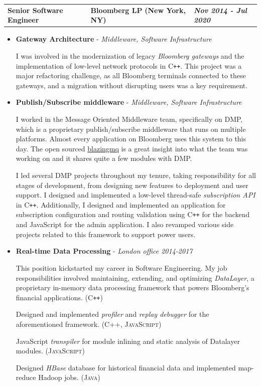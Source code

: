 \documentclass[a4paper,10pt]{article}
\newcommand*{\mahogany}{\textcolor{Mahogany}}
\newcommand{\jobtitle}[4]{
\vspace{0.3cm}
\begin{tabularx}
{\textwidth}
{ >{\raggedright\arraybackslash}p{6.5cm}
  >{\raggedright\arraybackslash}X
  >{\raggedleft\arraybackslash}p{4cm} }
\large\textbf{#1} &
\large\textbf{\mahogany{#2}} \normalsize\textbf{(#3)} &
\textit{\large\textbf{#4}}
\end{tabularx}
\vspace{-0.4cm}
}
\begin{document}
\jobtitle{Senior Software Engineer}{Bloomberg LP}{New York, NY}{Nov 2014 - Jul 2020}
\begin{itemize}[leftmargin=.27in,label=] \setlength\itemsep{-0.1cm}
	\item \textbf{Gateway Architecture} - \textit{Middleware, Software Infrastructure}

I was involved in the modernization of legacy \textit{Bloomberg gateways}
and the implementation of low-level network protocols in \textsc{C\texttt{++}}.
This project was a major refactoring challenge,
as all Bloomberg terminals connected to these gateways, and a migration without disrupting users was a key requirement.


    \vspace{0.2cm}
    \item \textbf{Publish/Subscribe middleware} - \textit{Middleware, Software Infrastructure}

I worked in the Message Oriented Middleware team, specifically on DMP, which is a proprietary publish/subscribe middleware that runs on multiple platforms. Almost every application on Bloomberg uses this system to this day.
The open sourced \href{https://bloomberg.github.io/blazingmq/}{blazingmq} is a great insight into what the team was working on and it shares quite a few modules with DMP.

I led several DMP projects throughout my tenure, taking responsibility for all stages of development, from designing new features to deployment and user support.
I designed and implemented a low-level thread-safe \textit{subscription API} in \textsc{C\texttt{++}}.
Additionally, I designed and implemented an application for subscription configuration and routing validation using \textsc{C\texttt{++}} for the backend and JavaScript for the admin application.
I also revamped various side projects related to this framework to support power users.

    \vspace{0.2cm}
    \item \textbf{Real-time Data Processing} - \textit{London office 2014-2017}

This position kickstarted my career in Software Engineering.
My job responsibilities involved maintaining, extending, and optimizing \textit{DataLayer},
a proprietary in-memory data processing framework that powers Bloomberg's financial applications. \textsc{(C\texttt{++})}

    Designed and implemented \textit{profiler} and \textit{replay debugger} for the aforementioned framework. \textsc{(C++, JavaScript)}

    JavaScript \textit{transpiler} for module inlining and static analysis of Datalayer modules. \textsc{(JavaScript)}

    Designed \textit{HBase} database for historical financial data and implemented map-reduce Hadoop jobs. \textsc{(Java)}
\end{itemize}
\end{document}
